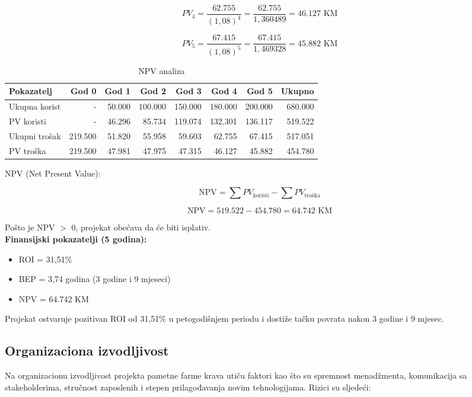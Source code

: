 \documentclass{article}
\begin{document}
$$PV_4 = \frac{62.755}{(1,08)^4} = \frac{62.755}{1,360489} = 46.127 \text{ KM}$$

$$PV_5 = \frac{67.415}{(1,08)^5} = \frac{67.415}{1,469328} = 45.882 \text{ KM}$$

\begin{table}[h]
\centering
\caption{NPV analiza}
\begin{tabular}{|l|r|r|r|r|r|r|r|}
\hline
\textbf{Pokazatelj} & \textbf{God 0} & \textbf{God 1} & \textbf{God 2} & \textbf{God 3} & \textbf{God 4} & \textbf{God 5} & \textbf{Ukupno} \\ \hline
Ukupna korist & - & 50.000 & 100.000 & 150.000 & 180.000 & 200.000 & 680.000 \\ \hline
PV koristi & - & 46.296 & 85.734 & 119.074 & 132.301 & 136.117 & 519.522 \\ \hline
Ukupni trošak & 219.500 & 51.820 & 55.958 & 59.603 & 62.755 & 67.415 & 517.051 \\ \hline
PV troška & 219.500 & 47.981 & 47.975 & 47.315 & 46.127 & 45.882 & 454.780 \\ \hline
\end{tabular}
\end{table}

\noindent
NPV (Net Present Value):

$$\text{NPV} = \sum PV_{\text{koristi}} - \sum PV_{\text{troška}}$$

$$\text{NPV} = 519.522 - 454.780 = 64.742 \text{ KM}$$


\noindent
Pošto je NPV $>$ 0, projekat obećava da će biti isplativ.\\

\noindent
\textbf{Finansijski pokazatelji (5 godina):}
\begin{itemize}
    \item ROI = 31,51\%
    \item BEP = 3,74 godina (3 godine i 9 mjeseci)
    \item NPV = 64.742 KM
\end{itemize}

\noindent
Projekat ostvaruje pozitivan ROI od 31,51\% u petogodišnjem periodu i dostiže tačku povrata nakon 3 godine i 9 mjesec. 


\subsection{Organizaciona izvodljivost}

Na organizacionu izvodljivost projekta pametne farme krava utiču faktori kao što su spremnost menadžmenta, komunikacija sa stakeholderima, stručnost zaposlenih i stepen prilagođavanja novim tehnologijama. Rizici su sljedeći:\\
\end{document}
